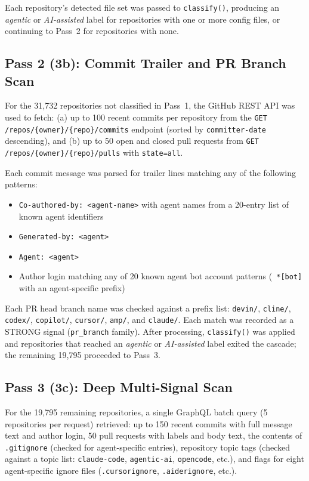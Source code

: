 Each repository's detected file set was passed to \texttt{classify()}, producing an \emph{agentic} or \emph{AI-assisted} label for repositories with one or more config files, or continuing to Pass~2 for repositories with none.

\subsection{Pass 2 (3b): Commit Trailer and PR Branch Scan}

For the 31,732 repositories not classified in Pass~1, the GitHub REST API was used to fetch: (a) up to 100 recent commits per repository from the \texttt{GET /repos/\{owner\}/\{repo\}/commits} endpoint (sorted by \texttt{committer-date} descending), and (b) up to 50 open and closed pull requests from \texttt{GET /repos/\{owner\}/\{repo\}/pulls} with \texttt{state=all}.

Each commit message was parsed for trailer lines matching any of the following patterns:
\begin{itemize}
  \item \texttt{Co-authored-by: <agent-name>} with agent names from a 20-entry list of known agent identifiers
  \item \texttt{Generated-by: <agent>}
  \item \texttt{Agent: <agent>}
  \item Author login matching any of 20 known agent bot account patterns (\eg\ \texttt{*[bot]} with an agent-specific prefix)
\end{itemize}

Each PR head branch name was checked against a prefix list: \texttt{devin/}, \texttt{cline/}, \texttt{codex/}, \texttt{copilot/}, \texttt{cursor/}, \texttt{amp/}, and \texttt{claude/}. Each match was recorded as a STRONG signal (\texttt{pr\_branch} family). After processing, \texttt{classify()} was applied and repositories that reached an \emph{agentic} or \emph{AI-assisted} label exited the cascade; the remaining 19,795 proceeded to Pass~3.

\subsection{Pass 3 (3c): Deep Multi-Signal Scan}

For the 19,795 remaining repositories, a single GraphQL batch query (5 repositories per request) retrieved: up to 150 recent commits with full message text and author login, 50 pull requests with labels and body text, the contents of \texttt{.gitignore} (checked for agent-specific entries), repository topic tags (checked against a topic list: \texttt{claude-code}, \texttt{agentic-ai}, \texttt{opencode}, etc.), and flags for eight agent-specific ignore files (\texttt{.cursorignore}, \texttt{.aiderignore}, etc.).

